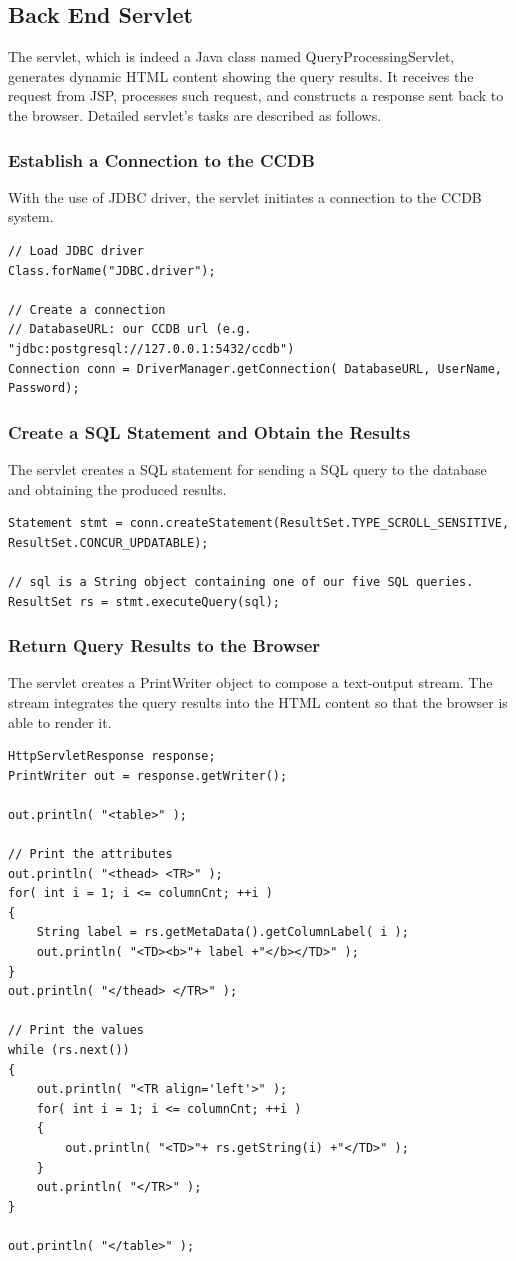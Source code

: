 \documentclass[11pt]{article}
\begin{document}
\subsection{Back End Servlet}
The servlet, which is indeed a Java class named QueryProcessingServlet, generates dynamic HTML content showing the query results. It receives the request from JSP, processes such request, and constructs a response sent back to the browser. Detailed servlet's tasks are described as follows.

\subsubsection{Establish a Connection to the CCDB}
With the use of JDBC driver, the servlet initiates a connection to the CCDB system.
\begin{verbatim}
// Load JDBC driver
Class.forName("JDBC.driver");

// Create a connection
// DatabaseURL: our CCDB url (e.g. "jdbc:postgresql://127.0.0.1:5432/ccdb")
Connection conn = DriverManager.getConnection( DatabaseURL, UserName, Password);
\end{verbatim}

\subsubsection{Create a SQL Statement and Obtain the Results}
The servlet creates a SQL statement for sending a SQL query to the database and obtaining the produced results.
\begin{verbatim}
Statement stmt = conn.createStatement(ResultSet.TYPE_SCROLL_SENSITIVE, ResultSet.CONCUR_UPDATABLE);

// sql is a String object containing one of our five SQL queries.
ResultSet rs = stmt.executeQuery(sql);
\end{verbatim}

\subsubsection{Return Query Results to the Browser}
The servlet creates a PrintWriter object to compose a text-output stream. The stream integrates the query results into the HTML content so that the browser is able to render it.
\begin{verbatim}
HttpServletResponse response;
PrintWriter out = response.getWriter();

out.println( "<table>" );

// Print the attributes
out.println( "<thead> <TR>" );
for( int i = 1; i <= columnCnt; ++i )
{
    String label = rs.getMetaData().getColumnLabel( i );
    out.println( "<TD><b>"+ label +"</b></TD>" );
}
out.println( "</thead> </TR>" );

// Print the values
while (rs.next())
{
    out.println( "<TR align='left'>" );
    for( int i = 1; i <= columnCnt; ++i )
    {
        out.println( "<TD>"+ rs.getString(i) +"</TD>" );
    }
    out.println( "</TR>" );
}

out.println( "</table>" );
\end{verbatim}
\end{document}

